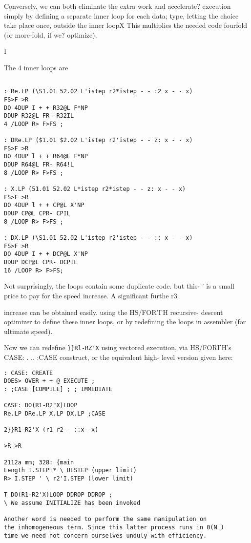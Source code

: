 {{{{{{{{{Conversely, we can both eliminate the extra work and accelerate?
execution simply by deﬁning a separate inner loop for each data;
type, letting the choice take place once, outside the inner loopX
This multiplies the needed code fourfold (or more-fold, if we?
optimize).

I

The 4 inner loops are
\begin{verbatim}

: Re.LP (\S1.01 52.02 L'istep r2*istep - - :2 x - - x)
FS>F >R
DO 4DUP I + + R32@L F*NP
DDUP R32@L FR- R32IL
4 /LOOP R> F>FS ;

: DRe.LP ($1.01 $2.02 L'istep r2'istep - - z: x - - x)
FS>F >R
DO 4DUP l + + R64@L F*NP
DDUP R64@L FR- R64!L
8 /LOOP R> F>FS ;

: X.LP (51.01 52.02 L*istep r2*istep - - z: x - - x)
FS>F >R
DO 4DUP l + + CP@L X'NP
DDUP CP@L CPR- CPIL
8 /LOOP R> F>FS ;

: DX.LP (\S1.01 52.02 L'istep r2'istep - - :: x - - x)
FS>F >R
DO 4DUP I + + DCP@L X'NP
DDUP DCP@L CPR- DCPIL
16 /LOOP R> F>FS;
\end{verbatim} 

Not surprisingly, the loops contain some duplicate code. but this- '
is a small price to pay for the speed increase. A signiﬁcant furthe r3

 


increase can be obtained easily. using the HS/FOR'I'H recursive-
descent optimizer to deﬁne these inner loops, or by redeﬁning
the loops in assembler (for ultimate speed).

Now we can redeﬁne \verb|}}Rl-RZ'X| using vectored execution, via
HS/FORI'H's CASE: . .. :CASE construct, or the equivalent high-
level version given here:

\begin{verbatim}
: CASE: CREATE
DOES> OVER + + @ EXECUTE ;
: ;CASE [COMPILE] ; ; IMMEDIATE

CASE: DO(R1-R2"X)LOOP
Re.LP DRe.LP X.LP DX.LP ;CASE

2}}R1-R2'X (r1 r2-- ::x--x)

>R >R

2112a mm; 328: {main
Length I.STEP * \ ULSTEP (upper limit)
R> I.STEP ' \ r2'I.STEP (lower limit)

T DO(R1-R2'X)LOOP DDROP DDROP ;
\ We assume INITIALIZE has been invoked

Another word is needed to perform the same manipulation on
the inhomogeneous term. Since this latter process runs in 0(N )
time we need not concern ourselves unduly with efficiency.


\end{verbatim}}}}}}}}}}

